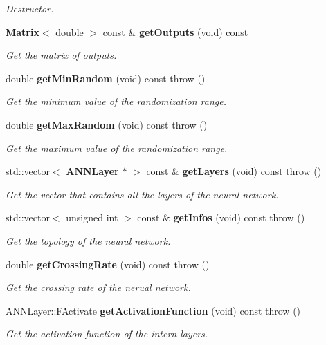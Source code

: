 \begin{DoxyCompactItemize}
\begin{DoxyCompactList}\small\item\em Destructor. \end{DoxyCompactList}\item 
{\bf Matrix}$<$ double $>$ const \& {\bf get\+Outputs} (void) const 
\begin{DoxyCompactList}\small\item\em Get the matrix of outputs. \end{DoxyCompactList}\item 
double {\bf get\+Min\+Random} (void) const   throw ()
\begin{DoxyCompactList}\small\item\em Get the minimum value of the randomization range. \end{DoxyCompactList}\item 
double {\bf get\+Max\+Random} (void) const   throw ()
\begin{DoxyCompactList}\small\item\em Get the maximum value of the randomization range. \end{DoxyCompactList}\item 
std\+::vector$<$ {\bf A\+N\+N\+Layer} $\ast$ $>$ const \& {\bf get\+Layers} (void) const   throw ()
\begin{DoxyCompactList}\small\item\em Get the vector that contains all the layers of the neural network. \end{DoxyCompactList}\item 
std\+::vector$<$ unsigned int $>$ const \& {\bf get\+Infos} (void) const   throw ()
\begin{DoxyCompactList}\small\item\em Get the topology of the neural network. \end{DoxyCompactList}\item 
double {\bf get\+Crossing\+Rate} (void) const   throw ()
\begin{DoxyCompactList}\small\item\em Get the crossing rate of the nerual network. \end{DoxyCompactList}\item 
A\+N\+N\+Layer\+::\+F\+Activate {\bf get\+Activation\+Function} (void) const   throw ()
\begin{DoxyCompactList}\small\item\em Get the activation function of the intern layers. \end{DoxyCompactList}\item 

\end{DoxyCompactItemize}
